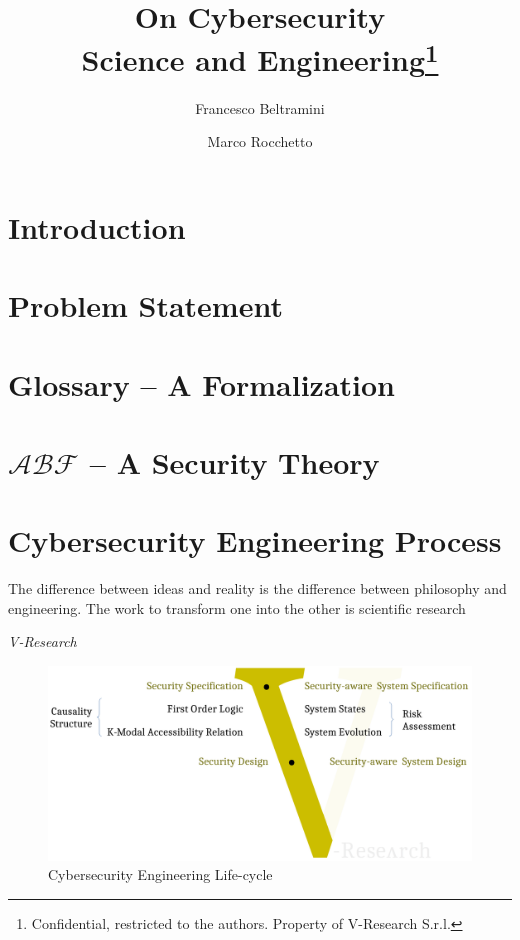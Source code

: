 \documentclass{article}
\date{}                     %
\theoremstyle{definition}
\theoremstyle{corollary}
\theoremstyle{lemma}
\theoremstyle{theorem}
\theoremstyle{theorem}
\newcommand{\assertionRegion}{\mathcal{A}}
\newcommand{\behaviorRegion}{\mathcal{B}}
\newcommand{\factRegion}{\mathcal{F}}
\begin{document}
\title{On Cybersecurity\\Science and Engineering\footnote{Confidential, restricted to the authors. Property of V-Research S.r.l.}}
\author[1]{Francesco Beltramini}
\author[1]{Marco Rocchetto}

\maketitle

\begin{abstract}
 
\end{abstract}
\newpage

\section{Introduction}\label{sec:intro}


\section{Problem Statement}\label{sec:problem}


\section{Glossary -- A Formalization}\label{sec:glossary}


\section{$\assertionRegion\behaviorRegion\factRegion$ -- A Security Theory}\label{sec:theory}


\section{Cybersecurity Engineering Process}\label{sec:process}
\epigraph{The difference between ideas and reality is the
difference between philosophy and engineering. The work to transform one into
the other is scientific research}{{\itshape V-Research}}
\begin{figure}[t]
	\centering
	\includegraphics[width=\textwidth]{vmodel.pdf}
	\caption{Cybersecurity Engineering Life-cycle}
	\label{fig:knowledge-belief}
\end{figure}
\end{document}
